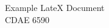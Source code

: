 \documentclass[11pt]{article}
\begin{document}

\begin{center}
    {\huge Example LateX Document} \\
    \vspace{0.5em}
    {\large CDAE 6590} \\
\end{center}

\noindent




\end{document}
